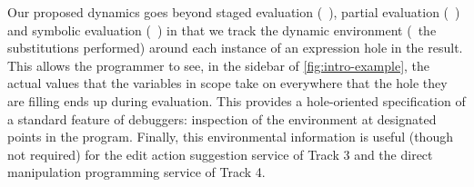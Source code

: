 Our proposed dynamics goes beyond staged evaluation (\eg{}~\cite{Taha:1999}), partial evaluation (\eg{}~\cite{Jones:1993uq}) and symbolic evaluation (\eg{}~\cite{King:1976}) in that we track the dynamic environment (\ie{}~the substitutions performed) around each instance of an expression hole in the result. This allows the programmer to see, in the sidebar of \autoref{fig:intro-example}, the actual values that the variables in scope take on everywhere that the hole they are filling ends up during evaluation. This provides a hole-oriented specification of a standard feature of debuggers: inspection of the environment at designated points in the program. Finally, this environmental information is useful (though not required) for the edit action suggestion service of Track 3 and the direct manipulation programming service of Track 4. 

